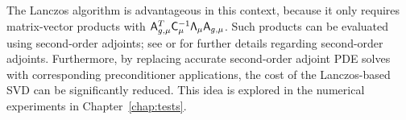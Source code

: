 \begin{remark}
  The Lanczos algorithm is advantageous in this context, because it only
  requires matrix-vector products with $\mathsf{A}_{g,\mu}^T \mathsf{C}_\mu^{-1}
  \mathsf{\Lambda}_\mu \mathsf{A}_{g,\mu}$.  Such products can be evaluated using
  second-order adjoints; see \cite{hicken:inexact2014} or
  \cite{dener:scitech2015} for further details regarding second-order adjoints.
  Furthermore, by replacing accurate second-order adjoint PDE solves with
  corresponding preconditioner applications, the cost of the Lanczos-based SVD
  can be significantly reduced.  This idea is explored in the numerical
  experiments in Chapter~\ref{chap:tests}.  
\end{remark}




